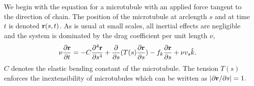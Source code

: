 \documentclass[11pt]{ucthesis}
\def\br{{\bf r}}
\begin{document}
\label{sect:MathAnalysis}
We begin with the equation for a microtubule with an applied force tangent to the direction of chain. The position
of the microtubule at arclength $s$ and at time $t$ is denoted $\br(s,t)$. As is usual at small scales, all inertial effects are negligible
and the system is dominated by the drag coefficient per unit length $\nu$,
\begin{equation}
\label{eq:microtubule}
\nu \frac{\partial \br}{\partial t} =  -C \frac{\partial^4 \br}{\partial s^4} + \frac{\partial}{\partial s}(T(s)\frac{\partial \br}{\partial s}) -
f_k \frac{\partial \br}{\partial s} + \nu v_{s}{\hat k} .
\end{equation}
$C$ denotes the elastic bending constant of the microtubule. The tension $T(s)$ enforces the inextensibility of microtubules which
can be written as  $|\partial \br/\partial s| = 1.$ 
\end{document}
